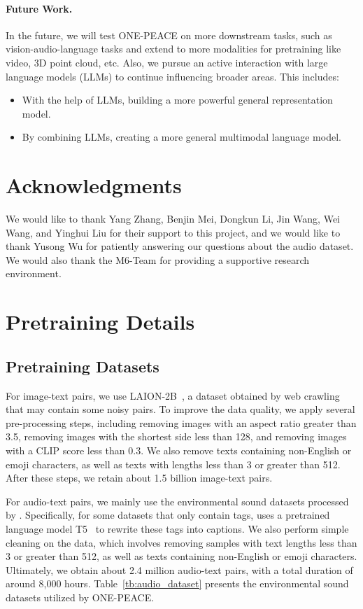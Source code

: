 \documentclass{article}
\newcommand{\onepeace}{ONE-PEACE\xspace}
\begin{document}
\paragraph{Future Work.}
In the future, we will test \onepeace on more downstream tasks, such as vision-audio-language tasks and extend to more modalities for pretraining like video, 3D point cloud, etc.
Also, we pursue an active interaction with large language models (LLMs) to continue influencing broader areas. This includes:

\begin{itemize}
\item With the help of LLMs, building a more powerful general representation model.
    \item By combining LLMs, creating a more general multimodal language model.
\end{itemize} 
\section*{Acknowledgments}
We would like to thank Yang Zhang, Benjin Mei, Dongkun Li, Jin Wang, Wei Wang, and Yinghui Liu for their support to this project, and we would like to thank Yusong Wu for patiently answering our questions about the audio dataset. We would also thank the M6-Team for providing a supportive research environment.

  


\newpage
\appendix
\section{Pretraining Details}

\subsection{Pretraining Datasets}
\label{app:audio_text_data_details}
For image-text pairs, we use LAION-2B~\cite{laion5b}, a dataset obtained by web crawling that may contain some noisy pairs. 
To improve the data quality, we apply several pre-processing steps, including removing images with an aspect ratio greater than 3.5, removing images with the shortest side less than 128, and removing images with a CLIP score less than 0.3. We also remove texts containing non-English or emoji characters, as well as texts with lengths less than 3 or greater than 512. 
After these steps, we retain about 1.5 billion image-text pairs.

For audio-text pairs, we mainly use the environmental sound datasets processed by \cite{laion_clap}. Specifically, for some datasets that only contain tags, \cite{laion_clap} uses a pretrained language model T5~\cite{T5} to rewrite these tags into captions.
We also perform simple cleaning on the data, which involves removing samples with text lengths less than 3 or greater than 512, as well as texts containing non-English or emoji characters. 
Ultimately, we obtain about 2.4 million audio-text pairs, with a total duration of around 8,000 hours.
Table~\ref{tb:audio_dataset} presents the environmental sound datasets utilized by \onepeace.
\end{document}
